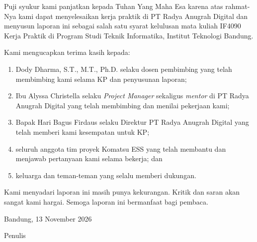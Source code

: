 \clearpage
{}

Puji syukur kami panjatkan kepada Tuhan Yang Maha Esa karena atas rahmat-Nya kami dapat menyelesaikan kerja praktik di PT Radya Anugrah Digital dan menyusun laporan ini sebagai salah satu syarat kelulusan mata kuliah IF4090 Kerja Praktik di Program Studi Teknik Informatika, Institut Teknologi Bandung.

Kami mengucapkan terima kasih kepada:
\begin{enumerate}[label=\arabic*)]
\item Dody Dharma, S.T., M.T., Ph.D. selaku dosen pembimbing yang telah membimbing kami selama KP dan penyusunan laporan;
\item Ibu Alyssa Christella selaku \textit{Project Manager} sekaligus \textit{mentor} di PT Radya Anugrah Digital yang telah membimbing dan menilai pekerjaan kami;
\item Bapak Hari Bagus Firdaus selaku Direktur PT Radya Anugrah Digital yang telah memberi kami kesempatan untuk KP;
\item seluruh anggota tim proyek Komatsu ESS yang telah membantu dan menjawab pertanyaan kami selama bekerja; dan
\item keluarga dan teman-teman yang selalu memberi dukungan.
\end{enumerate}

Kami menyadari laporan ini masih punya kekurangan. Kritik dan saran akan sangat kami hargai. Semoga laporan ini bermanfaat bagi pembaca.

\vspace{1.2cm}
\begin{flushright}
Bandung, 13 November 2026

\vspace{1.2cm}
Penulis

\end{flushright}
